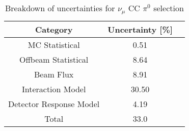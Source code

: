 \documentclass[../main.tex]{subfiles}
\begin{document}
\begin{table}[H]
    \caption{Breakdown of uncertainties for $\nu_{\mu}$ CC $\pi^{0}$ selection}
    \vspace{0.1cm}
    \centering
    \begin{tabular}{ c c c } 
    \hline
    Category & Uncertainty [\%] \\
    \hline
    MC Statistical & 0.51 \\
    Offbeam Statistical & 8.64 \\ 
    Beam Flux & 8.91 \\
    Interaction Model & 30.50 \\
    Detector Response Model & 4.19 \\
    \hline
    Total & 33.0 \\
    \hline
    \end{tabular}
    \label{Tab:totaluncertainy}
\end{table}
\end{document}
